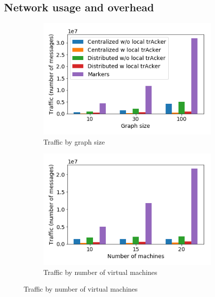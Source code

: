 \subsection{Network usage and overhead} \label{overhead}

\begin{figure}[t!]
    \begin{subfigure}[b]{0.32\textwidth}
            \includegraphics[width=0.99\textwidth]{pics/traffic_by_graph_size_bars.png}
            \caption{Traffic by graph size}
            \label{traffic_graph}
    \end{subfigure}
    \hspace{5mm}
    \begin{subfigure}[b]{0.32\textwidth}
            \includegraphics[width=0.99\textwidth]{pics/traffic_by_number_of_machines_bars.png}
            \caption{Traffic by number of virtual machines}

\end{subfigure}
\end{figure}
